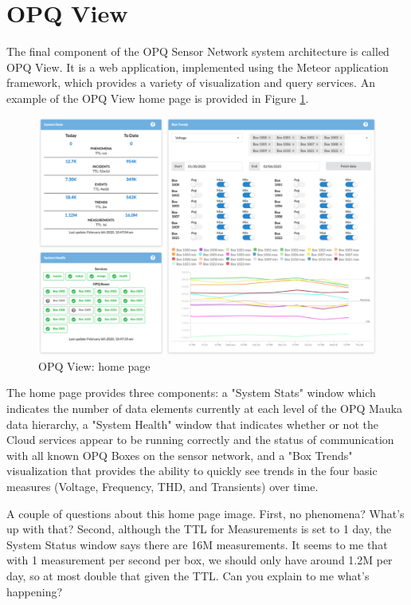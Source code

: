 \section{OPQ View}
\label{sec:opq-view}

The final component of the OPQ Sensor Network system architecture is called OPQ View. It is a web application, implemented using the Meteor application framework, which provides a variety of visualization and query services.  An example of the OPQ View home page is provided in Figure \ref{fig:opq-view-home}.

\begin{figure}
\center \includegraphics[width=5in]{images/view/homepage.png}
\caption{OPQ View: home page}
\label{fig:opq-view-home}
\end{figure}

The home page provides three components:  a "System Stats" window which indicates the number of data elements currently at each level of the OPQ Mauka data hierarchy, a "System Health" window that indicates whether or not the Cloud services appear to be running correctly and the status of communication with all known OPQ Boxes on the sensor network, and a "Box Trends" visualization that provides the ability to quickly see trends in the four basic measures (Voltage, Frequency, THD, and Transients) over time.

\begin{tcolorbox}[colback=red!5!white,colframe=red!75!black,title=ANTHONY]
A couple of questions about this home page image. First, no phenomena? What's up with that? Second, although the TTL for Measurements is set to 1 day, the System Status window says there are 16M measurements. It seems to me that with 1 measurement per second per box, we should only have around 1.2M per day, so at most double that given the TTL.  Can you explain to me what's happening?
\end{tcolorbox}

